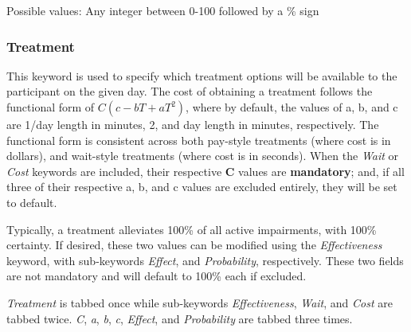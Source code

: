 \documentclass{article}
\begin{document}
 \newline
\indent Possible values: \newline
\indent\indent Any integer between 0-100 followed by a \% sign \newline
    

\subsubsection{Treatment}
This keyword is used to specify which treatment options will be available to the participant on the given day. The cost of obtaining a treatment follows the functional form of $C(c - bT + aT^2)$, where by default, the values of a, b, and c are 1\slash day length in minutes, 2, and day length in minutes, respectively. The functional form is consistent across both pay-style treatments (where cost is in dollars), and wait-style treatments (where cost is in seconds). When the \textit{Wait} or \textit{Cost} keywords are included, their respective \textbf{C} values are \textbf{mandatory}; and, if all three of their respective a, b, and c values are excluded entirely, they will be set to default. 

Typically, a treatment alleviates 100\% of all active impairments, with 100\% certainty. If desired, these two values can be modified using the \textit{Effectiveness} keyword, with sub-keywords \textit{Effect}, and \textit{Probability}, respectively. These two fields are not mandatory and will default to 100\% each if excluded.

\textit{Treatment} is tabbed once while sub-keywords \textit{Effectiveness}, \textit{Wait}, and \textit{Cost} are tabbed twice. \textit{C}, \textit{a}, \textit{b}, \textit{c}, \textit{Effect}, and \textit{Probability} are tabbed three times. \newline

\end{document}
